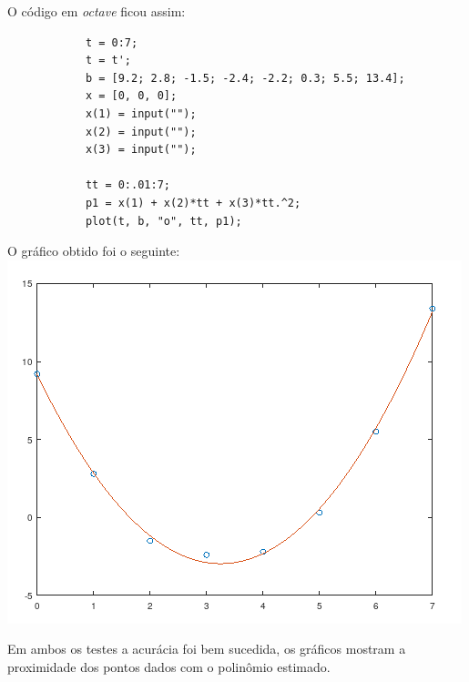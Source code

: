 \documentclass[a4paper,11pt]{article}
\begin{document}
        O código em \textit{octave} ficou assim:
        \begin{lstlisting}
            t = 0:7;
            t = t';
            b = [9.2; 2.8; -1.5; -2.4; -2.2; 0.3; 5.5; 13.4];
            x = [0, 0, 0];
            x(1) = input("");
            x(2) = input("");
            x(3) = input("");
            
            tt = 0:.01:7;
            p1 = x(1) + x(2)*tt + x(3)*tt.^2;
            plot(t, b, "o", tt, p1);
        \end{lstlisting}
        
        O gráfico obtido foi o seguinte: \\
        \includegraphics[scale=0.7]{pol2}
        
        Em ambos os testes a acurácia foi bem sucedida, os gráficos mostram a proximidade dos pontos dados com o polinômio estimado.
        
\end{document}
